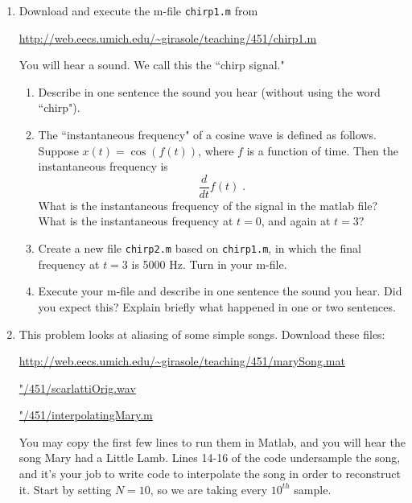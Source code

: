 \documentclass[draft]{siamltex}
\begin{document}
\begin{enumerate}
\item Download and execute the m-file \texttt{chirp1.m} from 

\vspace{2mm} 
\url{http://web.eecs.umich.edu/~girasole/teaching/451/chirp1.m}

\vspace{2mm} 
You will hear a sound. We call this the ``chirp signal."

\vspace{2mm} 
\begin{enumerate}
\item Describe in one sentence the sound you hear (without using the word ``chirp").

\vspace{2mm} 
\item The ``instantaneous frequency" of a cosine wave is defined as follows. Suppose $x(t) = \cos( f(t) )$, where $f$ is a function of time. Then the instantaneous frequency is $$\frac{d}{dt} f(t)\;.$$ What is the instantaneous frequency of the signal in the matlab file? What is the instantaneous frequency at $t=0$, and again at $t=3$? 

\vspace{2mm} 
\item Create a new file \texttt{chirp2.m} based on \texttt{chirp1.m}, in which the final frequency at $t=3$ is 5000 Hz. Turn in your m-file.

\vspace{2mm} 
\item Execute your m-file and describe in one sentence the sound you hear. Did you expect this? Explain briefly what happened in one or two sentences.

\end{enumerate}


\vspace{5mm}
\item This problem looks at aliasing of some simple songs. Download these files:

\vspace{2mm} 
\url{http://web.eecs.umich.edu/~girasole/teaching/451/marySong.mat}

\vspace{2mm} 
\url{"/451/scarlattiOrig.wav}

\vspace{2mm} 
\url{"/451/interpolatingMary.m}

\vspace{2mm}
You may copy the first few lines to run them in Matlab, and you will hear the song Mary had a Little Lamb. Lines 14-16 of the code undersample the song, and it's your job to write code to interpolate the song in order to reconstruct it. Start by setting $N=10$, so we are taking every $10^{th}$ sample. 


\end{enumerate}
\end{document}
